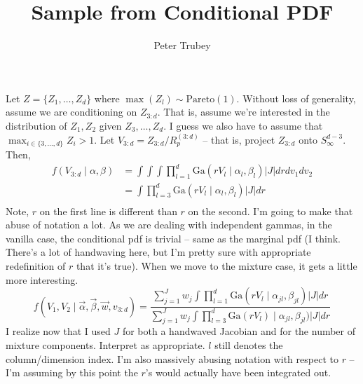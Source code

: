 \documentclass{article}
\title{Sample from Conditional PDF}
\author{Peter Trubey}
\date{}
\begin{document}
\maketitle


Let $Z = \{Z_1,\ldots,Z_d\}$ where $\max(Z_l) \sim \text{Pareto}(1)$.  Without loss of generality,
  assume we are conditioning on $Z_{3:d}$.  That is, assume we're interested in the distribution of
  $Z_1,Z_2$ given $Z_3,\ldots,Z_d$.  I guess we also have to assume that
  $\max_{i\in\{3,\ldots,d\}}Z_i > 1$. Let $V_{3:d} = Z_{3:d} / R_p^{(3:d)}$ -- that is, project
  $Z_{3:d}$ onto $S_{\infty}^{d-3}$.  Then,
\begin{equation*}
  \begin{aligned}
    f(V_{3:d}\mid\alpha,\beta) &= \int\int\int\prod_{l = 1}^d
          \text{Ga}\left(rV_l\mid\alpha_l,\beta_l\right)\lvert J\rvert dr dv_1 dv_2\\
        &= \int \prod_{l = 3}^d\text{Ga}(rV_l\mid\alpha_l,\beta_l)\lvert J \lvert dr \\
  \end{aligned}
\end{equation*}
Note, $r$ on the first line is different than $r$ on the second.  I'm going to make that abuse of
  notation a lot.  As we are dealing with independent gammas, in the vanilla case, the conditional
  pdf is trivial -- same as the marginal pdf (I think.  There's a lot of handwaving here, but I'm
  pretty sure with appropriate redefinition of $r$ that it's true).  When we move to the mixture
  case, it gets a little more interesting.
\begin{equation*}
    f(V_1,V_2\mid \vec{\alpha},\vec{\beta},\vec{w},v_{3:d}) =
      \frac{\sum_{j = 1}^Jw_j\int \prod_{l = 1}^d \text{Ga}(rV_l\mid \alpha_{jl},\beta_{jl})\lvert J\rvert dr}{
        \sum_{j = 1}^Jw_j\int\prod_{l = 3}^d\text{Ga}(rV_l)\mid\alpha_{jl},\beta_{jl})\lvert J\rvert dr}
\end{equation*}
I realize now that I used $J$ for both a handwaved Jacobian and for the number of mixture components.
  Interpret as appropriate.  $l$ still denotes the column/dimension index.  I'm also massively
  abusing notation with respect to $r$ -- I'm assuming by this point the $r$'s would actually have
  been integrated out.
\end{document}

